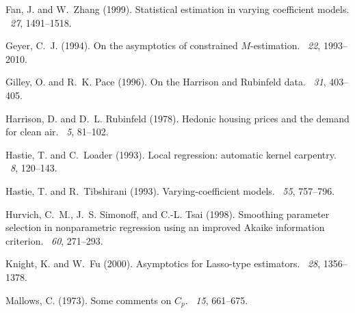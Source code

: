 \documentclass[authoryear,review, 12pt]{elsarticle}
\begin{document}
\begin{thebibliography}{}
Fan, J. and W.~Zhang (1999).
\newblock Statistical estimation in varying coefficient models.
~{\em 27}, 1491--1518.

Geyer, C.~J. (1994).
\newblock On the asymptotics of constrained ${M}$-estimation.
~{\em 22}, 1993--2010.

Gilley, O. and R.~K. Pace (1996).
\newblock On the {H}arrison and {R}ubinfeld data.
~{\em 31},
  403--405.

Harrison, D. and D.~L. Rubinfeld (1978).
\newblock Hedonic housing prices and the demand for clean air.
~{\em 5},
  81--102.

Hastie, T. and C.~Loader (1993).
\newblock Local regression: automatic kernel carpentry.
~{\em 8}, 120--143.

Hastie, T. and R.~Tibshirani (1993).
\newblock Varying-coefficient models.
~{\em 55},
  757--796.

Hurvich, C.~M., J.~S. Simonoff, and C.-L. Tsai (1998).
\newblock Smoothing parameter selection in nonparametric regression using an
  improved {A}kaike information criterion.
~{\em 60},
  271--293.

Knight, K. and W.~Fu (2000).
\newblock Asymptotics for {L}asso-type estimators.
~{\em 28}, 1356--1378.

Mallows, C. (1973).
\newblock Some comments on ${C}_p$.
~{\em 15}, 661--675.


\end{thebibliography}
\end{document}
